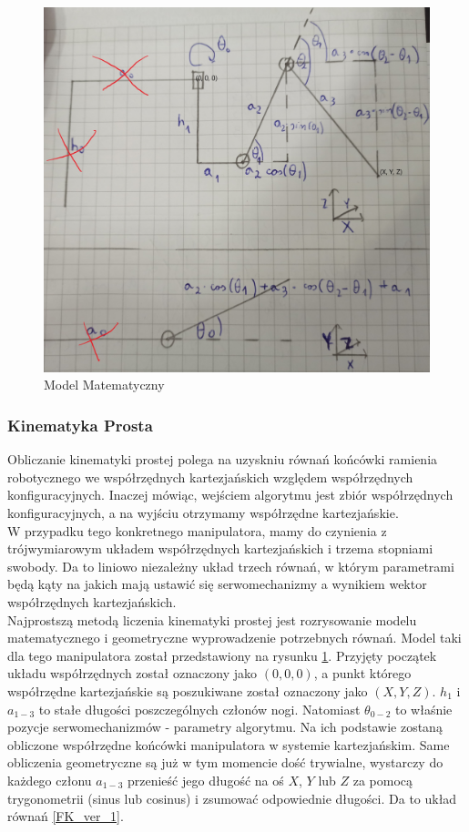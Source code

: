 \documentclass[a4paper,13pt]{article}
\begin{document}
\begin{figure}[H]
\includegraphics[width=\textwidth]{img/math_model.jpg}
\caption{Model Matematyczny}
\label{math_model}
\end{figure}

\subsubsection{Kinematyka Prosta}
Obliczanie kinematyki prostej polega na uzyskniu równań końcówki ramienia robotycznego we współrzędnych kartezjańskich względem współrzędnych konfiguracyjnych. Inaczej mówiąc, wejściem algorytmu jest zbiór współrzędnych konfiguracyjnych, a na wyjściu otrzymamy współrzędne kartezjańskie.\cite{robot_manipulators}\\

W przypadku tego konkretnego manipulatora, mamy do czynienia z trójwymiarowym układem współrzędnych kartezjańskich i trzema stopniami swobody. Da to liniowo niezależny układ trzech równań, w którym parametrami będą kąty na jakich mają ustawić się serwomechanizmy a wynikiem wektor współrzędnych kartezjańskich.\\

Najprostszą metodą liczenia kinematyki prostej jest rozrysowanie modelu matematycznego i geometryczne wyprowadzenie potrzebnych równań. Model taki dla tego manipulatora został przedstawiony na rysunku \ref{math_model}. Przyjęty początek układu współrzędnych został oznaczony jako $(0, 0, 0)$, a punkt którego współrzędne kartezjańskie są poszukiwane został oznaczony jako $(X, Y, Z)$. $h_1$ i $a_{1-3}$ to stałe długości poszczególnych członów nogi. Natomiast $\theta_{0-2}$ to właśnie pozycje serwomechanizmów - parametry algorytmu. Na ich podstawie zostaną obliczone współrzędne końcówki manipulatora w systemie kartezjańskim. Same obliczenia geometryczne są już w tym momencie dość trywialne, wystarczy do każdego członu $a_{1-3}$ przenieść jego długość na oś $X$, $Y$ lub $Z$ za pomocą trygonometrii (sinus lub cosinus) i zsumować odpowiednie długości. Da to układ równań \ref{FK_ver_1}.\\
\end{document}
